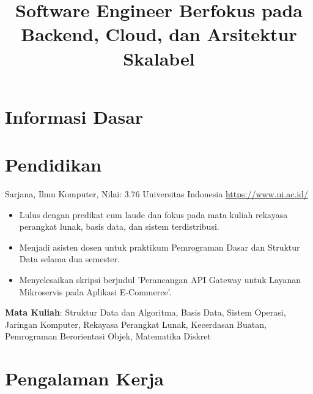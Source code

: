 \documentclass[a4paper, serif, 10pt]{moderncv}
\title{Software Engineer Berfokus pada Backend, Cloud, dan Arsitektur Skalabel}
\begin{document}
\maketitle

\section{Informasi Dasar}

\section{Pendidikan}

        {Sarjana, Ilmu Komputer, Nilai: 3.76}
        {Universitas Indonesia}
        {\url{https://www.ui.ac.id/}}
        {}
        {\begin{itemize}
\item Lulus dengan predikat cum laude dan fokus pada mata kuliah rekayasa perangkat lunak, basis data, dan sistem terdistribusi.
\item Menjadi asisten dosen untuk praktikum Pemrograman Dasar dan Struktur Data selama dua semester.
\item Menyelesaikan skripsi berjudul 'Perancangan API Gateway untuk Layanan Mikroservis pada Aplikasi E-Commerce'.
\end{itemize}
\textbf{Mata Kuliah}: Struktur Data dan Algoritma, Basis Data, Sistem Operasi, Jaringan Komputer, Rekayasa Perangkat Lunak, Kecerdasan Buatan, Pemrograman Berorientasi Objek, Matematika Diskret}
\section{Pengalaman Kerja}
\end{document}
